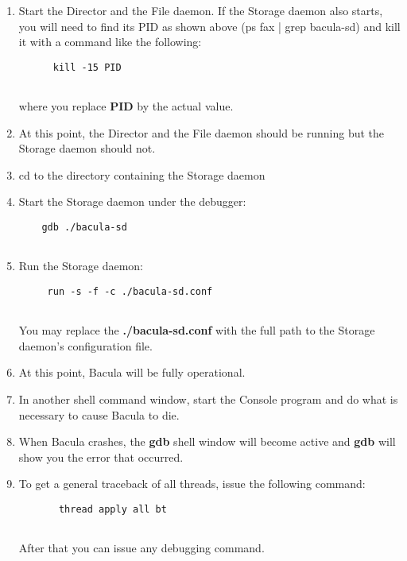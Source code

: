 \begin{enumerate}
\item Start the Director and the File daemon. If the  Storage daemon also
   starts, you will need to find its PID  as shown above (ps fax | grep
   bacula-sd) and kill it  with a command like the following:  

\footnotesize
\begin{verbatim}
      kill -15 PID
      
\end{verbatim}
\normalsize

where you replace {\bf PID} by the actual value. 
\item At this point, the Director and the File daemon should  be running but
   the Storage daemon should not.  
\item cd to the directory containing the Storage daemon  
\item Start the Storage daemon under the debugger:  

   \footnotesize
\begin{verbatim}
    gdb ./bacula-sd
    
\end{verbatim}
\normalsize

\item Run the Storage daemon:  

   \footnotesize
\begin{verbatim}
     run -s -f -c ./bacula-sd.conf
     
\end{verbatim}
\normalsize

You may replace the {\bf ./bacula-sd.conf} with the full path  to the Storage
daemon's configuration file.  
\item At this point, Bacula will be fully operational.  
\item In another shell command window, start the Console program  and do what
   is necessary to cause Bacula to die.  
\item When Bacula crashes, the {\bf gdb} shell window will  become active and
   {\bf gdb} will show you the error that  occurred.  
\item To get a general traceback of all threads, issue the following  command:
 

\footnotesize
\begin{verbatim}
       thread apply all bt
       
\end{verbatim}
\normalsize

After that you can issue any debugging command. 
\end{enumerate}

